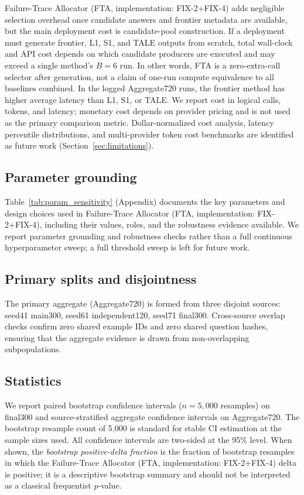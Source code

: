 Failure-Trace Allocator (FTA, implementation: FIX-2+FIX-4) adds negligible selection overhead once candidate answers and frontier
metadata are available, but the main deployment cost is candidate-pool construction.
If a deployment must generate frontier, L1, S1, and TALE outputs from scratch, total
wall-clock and API cost depends on which candidate producers are executed and may
exceed a single method's $B=6$ run. In other words, FTA is a zero-extra-call selector
after generation, not a claim of one-run compute equivalence to all baselines combined.
In the logged Aggregate720 runs, the frontier
method has higher average latency than L1, S1, or TALE.
We report cost in logical calls, tokens, and latency; monetary cost depends on provider pricing and is not used as the primary comparison metric.  Dollar-normalized cost analysis, latency percentile distributions, and multi-provider token cost benchmarks are identified as future work (Section~\ref{sec:limitations}).

\subsection{Parameter grounding}
\label{sec:param_grounding}

Table~\ref{tab:param_sensitivity} (Appendix) documents the key parameters and design choices used in Failure-Trace Allocator (FTA, implementation: FIX-2+FIX-4), including their values, roles, and the robustness evidence available.  We report parameter grounding and robustness checks rather than a full continuous hyperparameter sweep; a full threshold sweep is left for future work.

\subsection{Primary splits and disjointness}
The primary aggregate (Aggregate720) is formed from three disjoint sources: seed41 main300, seed61 independent120, seed71 final300.  Cross-source overlap checks confirm zero shared example IDs and zero shared question hashes, ensuring that the aggregate evidence is drawn from non-overlapping subpopulations.

\subsection{Statistics}
We report paired bootstrap confidence intervals \citep{efron1993bootstrap} ($n = 5{,}000$ resamples) on final300 and source-stratified aggregate confidence intervals on Aggregate720.  The bootstrap resample count of 5,000 is standard for stable CI estimation at the sample sizes used.  All confidence intervals are two-sided at the 95\% level.  When shown, the \emph{bootstrap positive-delta fraction} is the fraction of bootstrap resamples in which the Failure-Trace Allocator (FTA, implementation: FIX-2+FIX-4) delta is positive; it is a descriptive bootstrap summary and should not be interpreted as a classical frequentist $p$-value.
